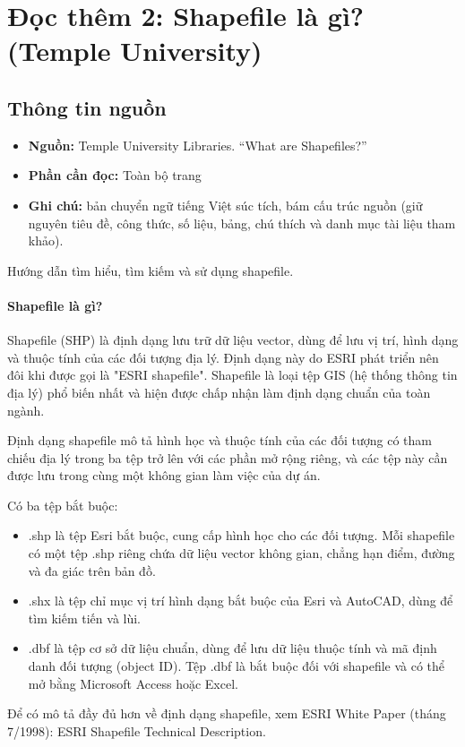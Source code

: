 \chapter{Đọc thêm 2: Shapefile là gì? (Temple University)}
\label{ch:M6L1DocThem2}

\section{Thông tin nguồn}

\begin{itemize}
  \item \textbf{Nguồn:} Temple University Libraries. ``What are Shapefiles?''
  \item \textbf{Phần cần đọc:} Toàn bộ trang
  \item \textbf{Ghi chú:} bản chuyển ngữ tiếng Việt súc tích, bám cấu trúc nguồn (giữ nguyên tiêu đề, công thức, số liệu, bảng, chú thích và danh mục tài liệu tham khảo).
\end{itemize}

Hướng dẫn tìm hiểu, tìm kiếm và sử dụng shapefile.

\subsubsection{Shapefile là gì?}

Shapefile (SHP) là định dạng lưu trữ dữ liệu vector, dùng để lưu vị trí, hình dạng và thuộc tính của các đối tượng địa lý. Định dạng này do ESRI phát triển nên đôi khi được gọi là "ESRI shapefile". Shapefile là loại tệp GIS (hệ thống thông tin địa lý) phổ biến nhất và hiện được chấp nhận làm định dạng chuẩn của toàn ngành.

Định dạng shapefile mô tả hình học và thuộc tính của các đối tượng có tham chiếu địa lý trong ba tệp trở lên với các phần mở rộng riêng, và các tệp này cần được lưu trong cùng một không gian làm việc của dự án.

Có ba tệp bắt buộc:

\begin{itemize}
\item
  .shp là tệp Esri bắt buộc, cung cấp hình học cho các đối tượng. Mỗi shapefile có một tệp .shp riêng chứa dữ liệu vector không gian, chẳng hạn điểm, đường và đa giác trên bản đồ.
\item
  .shx là tệp chỉ mục vị trí hình dạng bắt buộc của Esri và AutoCAD, dùng để tìm kiếm tiến và lùi.
\item
  .dbf là tệp cơ sở dữ liệu chuẩn, dùng để lưu dữ liệu thuộc tính và mã định danh đối tượng (object ID). Tệp .dbf là bắt buộc đối với shapefile và có thể mở bằng Microsoft Access hoặc Excel.
\end{itemize}

Để có mô tả đầy đủ hơn về định dạng shapefile, xem ESRI White Paper (tháng 7/1998): ESRI Shapefile Technical Description.
